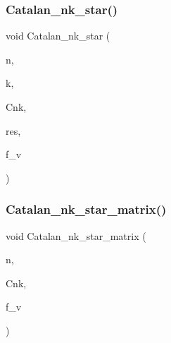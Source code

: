 \mbox{\label{global_8_c_a7ab517d5c1a799b2c861307095cc651b}} 
\subsubsection{\texorpdfstring{Catalan\+\_\+nk\+\_\+star()}{Catalan\_nk\_star()}}
{\footnotesize\ttfamily void Catalan\+\_\+nk\+\_\+star (\begin{DoxyParamCaption}\item[{\mbox{\hyperlink{galois_8h_a09fddde158a3a20bd2dcadb609de11dc}{I\+NT}}}]{n,  }\item[{\mbox{\hyperlink{galois_8h_a09fddde158a3a20bd2dcadb609de11dc}{I\+NT}}}]{k,  }\item[{\mbox{\hyperlink{classmatrix}{matrix}} \&}]{Cnk,  }\item[{\mbox{\hyperlink{classdiscreta__base}{discreta\+\_\+base}} \&}]{res,  }\item[{\mbox{\hyperlink{galois_8h_a09fddde158a3a20bd2dcadb609de11dc}{I\+NT}}}]{f\+\_\+v }\end{DoxyParamCaption})}

\mbox{\label{global_8_c_a62ffa2ad8cbaaf9dbb813890cea86a2f}} 
\subsubsection{\texorpdfstring{Catalan\+\_\+nk\+\_\+star\+\_\+matrix()}{Catalan\_nk\_star\_matrix()}}
{\footnotesize\ttfamily void Catalan\+\_\+nk\+\_\+star\+\_\+matrix (\begin{DoxyParamCaption}\item[{\mbox{\hyperlink{galois_8h_a09fddde158a3a20bd2dcadb609de11dc}{I\+NT}}}]{n,  }\item[{\mbox{\hyperlink{classmatrix}{matrix}} \&}]{Cnk,  }\item[{\mbox{\hyperlink{galois_8h_a09fddde158a3a20bd2dcadb609de11dc}{I\+NT}}}]{f\+\_\+v }\end{DoxyParamCaption})}

\mbox{\label{global_8_c_a9b4d3e77d06944060e008288a375902d}} 
